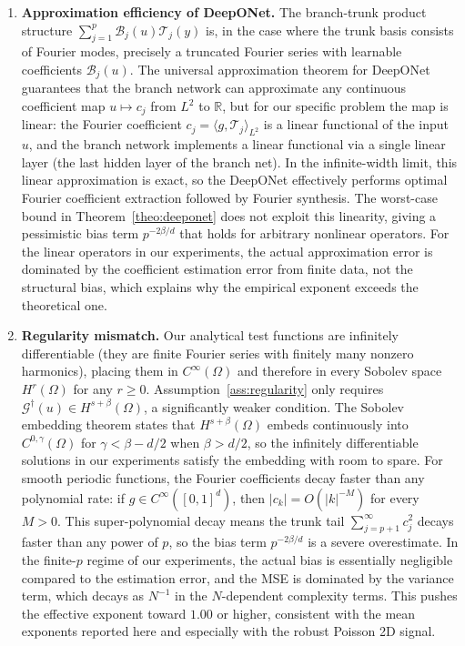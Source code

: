 \documentclass[12pt,a4paper]{article}
\begin{document}
\begin{enumerate}
    \item \textbf{Approximation efficiency of DeepONet.}
        The branch-trunk product structure $\sum_{j=1}^p \mathcal{B}_j(u) \mathcal{T}_j(y)$
        is, in the case where the trunk basis consists of Fourier modes, precisely a
        truncated Fourier series with learnable coefficients $\mathcal{B}_j(u)$.  The
        universal approximation theorem for DeepONet \citep{chen1995universal} guarantees
        that the branch network can approximate any continuous coefficient map
        $u \mapsto c_j$ from $L^2$ to $\mathbb{R}$, but for our specific problem
        the map is linear: the Fourier coefficient $c_j = \langle g, \mathcal{T}_j \rangle_{L^2}$
        is a linear functional of the input $u$, and the branch network implements a
        linear functional via a single linear layer (the last hidden layer of the
        branch net).  In the infinite-width limit, this linear approximation is
        exact, so the DeepONet effectively performs optimal Fourier coefficient
        extraction followed by Fourier synthesis.  The worst-case bound in
        Theorem~\ref{theo:deeponet} does not exploit this linearity, giving a
        pessimistic bias term $p^{-2\beta/d}$ that holds for arbitrary nonlinear
        operators.  For the linear operators in our experiments, the actual
        approximation error is dominated by the coefficient estimation error from
        finite data, not the structural bias, which explains why the empirical
        exponent exceeds the theoretical one.

    \item \textbf{Regularity mismatch.}
        Our analytical test functions are infinitely differentiable (they are
        finite Fourier series with finitely many nonzero harmonics), placing them
        in $C^\infty(\Omega)$ and therefore in every Sobolev space $H^r(\Omega)$ for
        any $r \geq 0$.  Assumption~\ref{ass:regularity} only requires
        $\mathcal{G}^\dagger(u) \in H^{s+\beta}(\Omega)$, a significantly weaker
        condition.  The Sobolev embedding theorem states that $H^{s+\beta}(\Omega)$
        embeds continuously into $C^{0,\gamma}(\Omega)$ for $\gamma < \beta - d/2$
        when $\beta > d/2$, so the infinitely differentiable solutions in our
        experiments satisfy the embedding with room to spare.  For smooth periodic
        functions, the Fourier coefficients decay faster than any polynomial rate:
        if $g \in C^\infty([0,1]^d)$, then $|c_k| = O(|k|^{-M})$ for every $M > 0$.
        This super-polynomial decay means the trunk tail $\sum_{j=p+1}^\infty c_j^2$
        decays faster than any power of $p$, so the bias term $p^{-2\beta/d}$ is
        a severe overestimate.  In the finite-$p$ regime of our experiments, the
        actual bias is essentially negligible compared to the estimation error,
        and the MSE is dominated by the variance term, which decays as $N^{-1}$
        in the $N$-dependent complexity terms.  This pushes the effective exponent
        toward $1.00$ or higher, consistent with the mean exponents reported here
        and especially with the robust Poisson 2D signal.


\end{enumerate}
\end{document}
